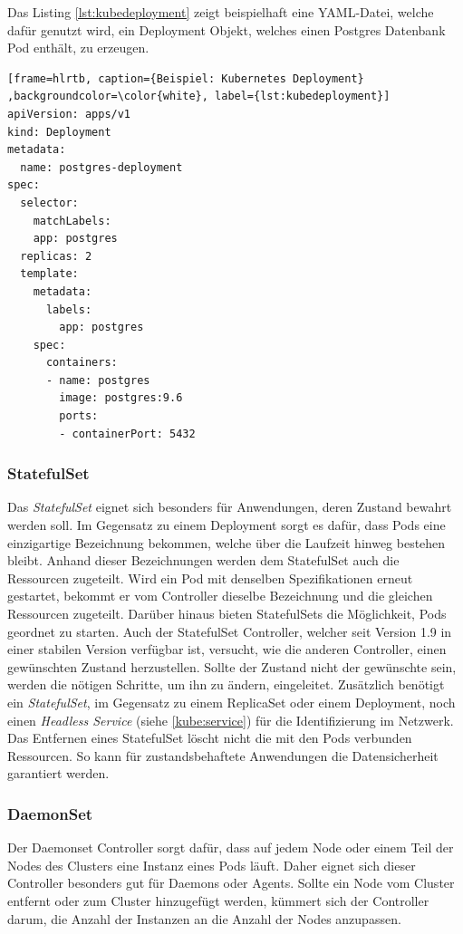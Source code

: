 Das Listing \ref{lst:kubedeployment} zeigt beispielhaft eine YAML-Datei, welche dafür genutzt wird, ein Deployment Objekt, welches einen Postgres Datenbank Pod enthält, zu erzeugen.  \medskip
\newpage

\lstset{language=yaml}
\begin{lstlisting}[frame=hlrtb, caption={Beispiel: Kubernetes Deployment} ,backgroundcolor=\color{white}, label={lst:kubedeployment}]
apiVersion: apps/v1
kind: Deployment
metadata:
  name: postgres-deployment
spec:
  selector:
    matchLabels:
    app: postgres
  replicas: 2
  template:
    metadata:
      labels:
        app: postgres
    spec:
      containers:
      - name: postgres
        image: postgres:9.6
        ports:
        - containerPort: 5432
\end{lstlisting}

\subsubsection{StatefulSet}
\label{kube:statefulset}
Das \textit{StatefulSet} eignet sich besonders für Anwendungen, deren Zustand bewahrt werden soll. Im Gegensatz zu einem Deployment sorgt es dafür, dass Pods eine einzigartige Bezeichnung bekommen, welche über die Laufzeit hinweg bestehen bleibt. Anhand dieser Bezeichnungen werden dem StatefulSet auch die Ressourcen zugeteilt. Wird ein Pod mit denselben Spezifikationen erneut gestartet, bekommt er vom Controller dieselbe Bezeichnung und die gleichen Ressourcen zugeteilt. Darüber hinaus bieten StatefulSets die Möglichkeit, Pods geordnet zu starten.
Auch der StatefulSet Controller, welcher seit Version 1.9 in einer stabilen Version verfügbar ist, versucht, wie die anderen Controller, einen gewünschten Zustand herzustellen. Sollte der Zustand nicht der gewünschte sein, werden die nötigen Schritte, um ihn zu ändern, eingeleitet. Zusätzlich benötigt ein \textit{StatefulSet}, im Gegensatz zu einem ReplicaSet oder einem Deployment, noch einen \textit{Headless Service} (siehe \ref{kube:service}) für die Identifizierung im Netzwerk.
Das Entfernen eines StatefulSet löscht nicht die mit den Pods verbunden Ressourcen. So kann für zustandsbehaftete Anwendungen die Datensicherheit garantiert werden.

\subsubsection{DaemonSet}
Der Daemonset Controller sorgt dafür, dass auf jedem Node oder einem Teil der Nodes des Clusters eine Instanz eines Pods läuft. Daher eignet sich dieser Controller besonders gut für Daemons oder Agents. Sollte ein Node vom Cluster entfernt oder zum Cluster hinzugefügt werden, kümmert sich der Controller darum, die Anzahl der Instanzen an die Anzahl der Nodes anzupassen.

